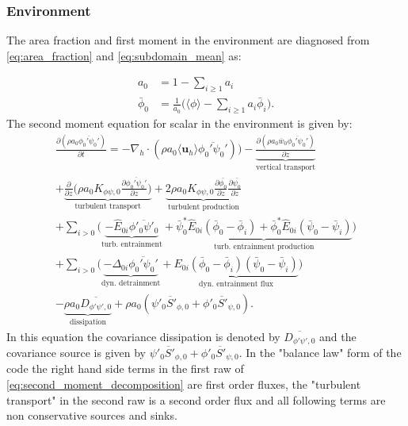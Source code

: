 \documentclass{report}
\begin{document}
\subsubsection{Environment} 
The area fraction and first moment in the environment are diagnosed from \eqref{eq:area_fraction} and  \eqref{eq:subdomain_mean} as:

\begin{align}
\label{eq:enviroment}
a_0 & = 1- \sum_{i\ge 1} a_i\\
\bar{\phi}_0 & =\frac{1}{a_0} \Big(\langle \phi \rangle - \sum_{i\ge 1} a_i \bar{\phi}_i \Big).
\end{align}
The second moment equation for scalar in the environment is given by:
\begin{multline}
\frac{\partial (\rho a_0 \overline{\phi_0' \psi_0'})}{\partial t} =
- \nabla_h \cdot (\rho a_0 \langle \mathbf{u}_h \rangle \overline{\phi_0' \psi_0'})) - \underbrace{\frac{\partial (\rho a_0 \overline{w}_0 \overline{\phi_0' \psi_0'})}{\partial z}}_{\text{vertical transport}} \\
+ \underbrace{\frac{\partial}{\partial z}\Bigg(\rho a_0 K_{\phi\psi,0} \frac{\partial\overline{\phi_0' \psi_0'} }{\partial z}\Bigg)}_{\text{turbulent transport}}
+ \underbrace{2\rho a_0 K_{\phi\psi,0} \frac{\partial \bar{\phi_0}}{\partial z}\frac{\partial \bar{\psi_0}}{\partial z}}_{\text{turbulent production}} \\
+ \sum_{i>0}\Bigg( \underbrace{-\hat{E}_{0i} \overline{\phi'_0 \psi'_0}}_{\text{turb. entrainment}} +  
\underbrace{\bar{\psi}^*_0\hat{E}_{0i}(\bar{\phi}_0-\bar{\phi}_i) + \bar{\phi}^*_0\hat{E}_{0i}(\bar{\psi}_0-\bar{\psi}_i)}_{\text{turb. entrainment production}} \Bigg) \\ 
+ \sum_{i>0}{\Bigg(\underbrace{- \Delta_{0i} \overline{\phi_0' \psi_0'}}_{\text{dyn. detrainment}} + \underbrace{E_{0i}(\bar{\phi}_0-\bar{\phi}_i) (\bar{\psi}_0-\bar{\psi}_i)}_{\text{dyn. entrainment flux}}} \Bigg) \\
- \underbrace{ \rho a_0 \overline{D_{\phi' \psi', 0}}}_{\text{dissipation}} + \rho a_0 (\overline{\psi'_0 S'_{\phi,0}} + \overline{\phi'_0 S'_{\psi,0}} ).
\label{eq:subdomain_scalar_variance} 
\end{multline} 
In this equation the covariance dissipation is denoted by $\overline{D_{\phi' \psi', 0}}$ and the covariance source is given by $\overline{\psi'_0 S'_{\phi,0}} + \overline{\phi'_0 S'_{\psi,0}}$. In the "balance law" form of the code the right hand side terms in the first raw of \eqref{eq:second_moment_decomposition} are first order fluxes, the "turbulent transport" in the second raw is a second order flux and all following terms are non conservative sources and sinks.
\end{document}
